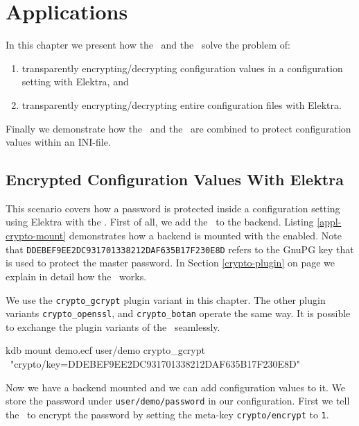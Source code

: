 \chapter{Applications}

In this chapter we present how the \crypto ~and the \fcrypt ~solve the problem of:
\begin{enumerate}
\item transparently encrypting/decrypting configuration values in a configuration setting with Elektra, and
\item transparently encrypting/decrypting entire configuration files with Elektra.
\end{enumerate}

Finally we demonstrate how the \base ~and the \crypto ~are combined to protect configuration values within an INI-file.

\section{Encrypted Configuration Values With Elektra}

This scenario covers how a password is protected inside a configuration setting using Elektra with the \crypto{}.
First of all, we add the \crypto ~to the backend.
Listing \ref{appl-crypto-mount} demonstrates how a backend is mounted with the \crypto{} enabled.
Note that \texttt{DDEBEF9EE2DC931701338212DAF635B17F230E8D} refers to the GnuPG key that is used to protect the master password.
In Section \ref{crypto-plugin} on page \pageref{crypto-plugin} we explain in detail how the \crypto ~works.

We use the \texttt{crypto\_gcrypt} plugin variant in this chapter.
The other plugin variants \texttt{crypto\_openssl}, and \texttt{crypto\_botan} operate the same way.
It is possible to exchange the plugin variants of the \crypto ~seamlessly.

\begin{code}[label=appl-crypto-mount,language=bash,caption={Mounting an Elektra backend with the \crypto{}}]
kdb mount demo.ecf user/demo crypto_gcrypt \
    "crypto/key=DDEBEF9EE2DC931701338212DAF635B17F230E8D"
\end{code}

Now we have a backend mounted and we can add configuration values to it.
We store the password under \texttt{user/demo/password} in our configuration.
First we tell the \crypto ~to encrypt the password by setting the meta-key \texttt{crypto/encrypt} to \texttt{1}.

